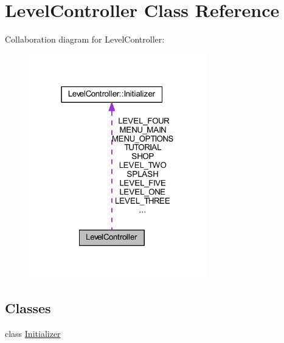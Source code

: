 \hypertarget{class_level_controller}{\section{Level\+Controller Class Reference}
\label{class_level_controller}
}


Collaboration diagram for Level\+Controller\+:\nopagebreak
\begin{figure}[H]
\begin{center}
\leavevmode
\includegraphics[width=219pt]{class_level_controller__coll__graph}
\end{center}
\end{figure}
\subsection*{Classes}
\begin{DoxyCompactItemize}
\item 
class \hyperlink{class_level_controller_1_1_initializer}{Initializer}
\end{DoxyCompactItemize}
